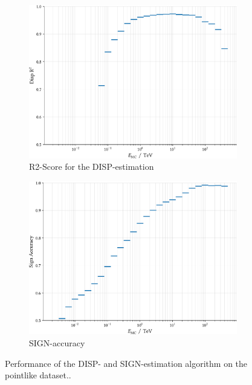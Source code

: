 \begin{figure}
    \begin{subfigure}{0.45\textwidth}
        \includegraphics[width=0.9\linewidth]{../analysis/plots/disp_gamma_r2_equal_sized.pdf} 
        \caption{R2-Score for the DISP-estimation}
    \end{subfigure}
    \begin{subfigure}{0.45\textwidth}
        \includegraphics[width=0.9\linewidth]{../analysis/plots/disp_gamma_acc_equal_sized.pdf}
        \caption{SIGN-accuracy}
    \end{subfigure}
    \caption{Performance of the DISP- and SIGN-estimation algorithm on the pointlike dataset..}
    \label{fig:disp_gamma_perf}
\end{figure}

